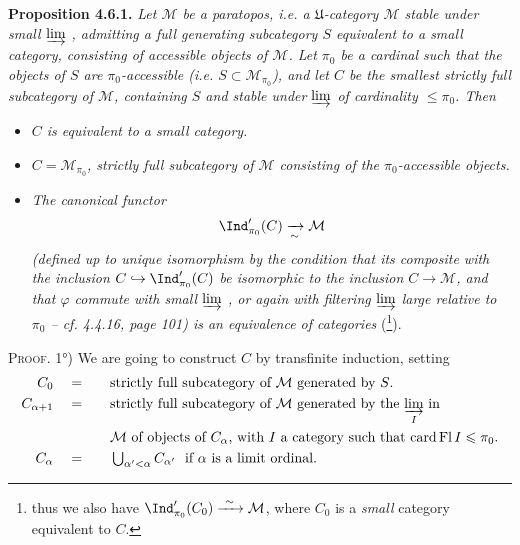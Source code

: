 \textbf{Proposition 4.6.1.} \textit{Let $\mathcal{M}$ be a paratopos, i.e. a $\mathfrak{U}$-category $\mathcal{M}$ stable under small $\varinjlim$ , admitting a full generating subcategory $S$ equivalent to a small category, consisting of accessible objects of $\mathcal{M}$. Let $\pi_0$ be a cardinal such that the objects of $S$ are $\pi_0$-accessible (i.e. $S\subset\mathcal{M}_{\pi_0}$), and let $C$ be the smallest strictly full subcategory of $\mathcal{M}$, containing $S$ and stable under $\varinjlim$ of cardinality $\leqslant\pi_0$. Then} %
\begin{itemize}[leftmargin=2.5em]
\item[\textit{1°)}] \textit{$C$ is equivalent to a small category.}


\item[\textit{2°)}] \textit{$C=\mathcal{M}_{\pi_0}$, strictly full subcategory of $\mathcal{M}$ consisting of the $\pi_0$-accessible objects.}
\item[\textit{3°)}] \textit{The canonical functor}
\[
\Ind'_{\pi_0}(C) \xrightarrow[\sim]{} \mathcal{M} %
\]
\textit{(defined up to unique isomorphism by the condition that its composite with the inclusion $C\hookrightarrow\Ind'_{\pi_0}(C)$ be isomorphic to the inclusion $C\longrightarrow\mathcal{M}$, and that $\varphi$ commute with small $\varinjlim$ , or again with filtering $\varinjlim$ large relative to $\pi_0$ – cf. 4.4.16, page 101) is an equivalence of categories} (\footnote[54]{thus we also have $\Ind'_{\pi_0}(C_0)\xrightarrow{\ \sim\ }\mathcal{M}$, where $C_0$ is a \textit{small} category equivalent to $C$.}).
\end{itemize}

\textsc{Proof}. 1°) We are going to construct $C$ by transfinite induction, setting
\[
\begin{aligned}
C_0 &\quad=\quad && \text{strictly full subcategory of $\mathcal{M}$ generated by $S$.}\\
C_{\alpha+1} &\quad=\quad && \text{strictly full subcategory of $\mathcal{M}$ generated by the $\varinjlim\limits_{I}$ in}\\
& && \text{$\mathcal{M}$ of objects of $C_\alpha$, with $I$ a category such that $\operatorname{card}\operatorname{Fl}I\leqslant\pi_0$.}\\
C_\alpha &\quad=\quad && \textstyle\bigcup_{\alpha'<\alpha}C_{\alpha'}\ \text{ if $\alpha$ is a limit ordinal.}
\end{aligned}
\]


